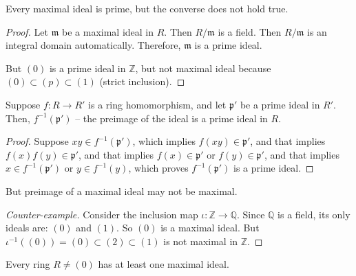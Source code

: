 \begin{corollary}
    Every maximal ideal is prime, but the converse does not hold true.
\end{corollary}
\begin{proof}
    Let \(\mathfrak{m}\) be a maximal ideal in \(R\). Then \(R/\mathfrak{m}\) is a field. Then \(R/\mathfrak{m}\) is an integral domain automatically. Therefore, \(\mathfrak{m}\) is a prime ideal.

    But \((0)\) is a prime ideal in \(\mathbb{Z}\), but not maximal ideal because \((0)\subset (p) \subset (1)\) (strict inclusion).
\end{proof}
\begin{theorem}
    Suppose \(f: R \longrightarrow R'\) is a ring homomorphism, and let \(\mathfrak{p}'\) be a prime ideal in \(R'\). Then, \(f^{-1}(\mathfrak{p}')\) -- the preimage of the ideal is a prime ideal in \(R\).
\end{theorem}
\begin{proof}
    Suppose \(xy \in f^{-1}(\mathfrak{p}')\), which implies \(f(xy) \in \mathfrak{p}'\), and that implies \(f(x)f(y) \in \mathfrak{p}'\), and that implies \(f(x) \in \mathfrak{p}' \text{ or } f(y) \in \mathfrak{p}'\), and that implies \(x \in f^{-1}(\mathfrak{p}') \text{ or } y \in f^{-1}(y)\), which proves \(f^{-1}(\mathfrak{p}')\) is a prime ideal.
\end{proof}
But preimage of a maximal ideal may not be maximal.
\begin{proof}[Counter-example]
    Consider the inclusion map \(\iota: \mathbb{Z} \longrightarrow \mathbb{Q}\). Since \(\mathbb{Q}\) is a field, its only ideals are: \((0)\) and \((1)\). So \((0)\) is a maximal ideal. But \(\iota^{-1}((0)) = (0) \subset (2) \subset (1)\) is not maximal in \(\mathbb{Z}\). 
\end{proof}
\begin{theorem}\label{theorem:maximalidealexistence}
    Every ring \(R \neq (0)\) has at least one maximal ideal.
\end{theorem}
